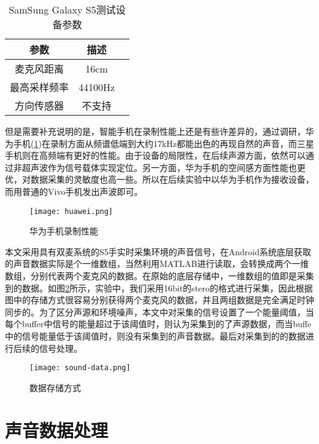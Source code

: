 \documentclass[winfonts]{njuthesis}
\begin{document}
		\begin{table}[H]
			\setlength{\belowcaptionskip}{7pt}
			\caption{SamSung Galaxy S5测试设备参数}
			\centering
			\begin{tabular}{ccc}
				\hline 
				参数 & 描述 \\
				\hline
				麦克风距离 & 16cm \\
				最高采样频率 & 44100Hz\\
				方向传感器 & 不支持\\
				\hline
			\end{tabular} 
			\vspace{0.2cm}
			\label{table: parameters-of-S5}
		\end{table}
	
		但是需要补充说明的是，智能手机在录制性能上还是有些许差异的，通过调研，华为手机(\ref{fig: huawei})在录制方面从频谱低端到大约17kHz都能出色的再现自然的声音，而三星手机则在高频端有更好的性能。由于设备的局限性，在后续声源方面，依然可以通过非超声波作为信号载体实现定位。另一方面，华为手机的空间感方面性能也更优，对数据采集的灵敏度也高一些。所以在后续实验中以华为手机作为接收设备，而用普通的Vivo手机发出声波即可。
		
		\begin{figure}[H]
			\centering
			\texttt{[image: huawei.png]} 
			\caption{华为手机录制性能}
			\label{fig: huawei}
		\end{figure}
	
		本文采用具有双麦系统的S5手实时采集环境的声音信号，在Android系统底层获取的声音数据实际是个一维数组，当然利用MATLAB进行读取，会转换成两个一维数组，分别代表两个麦克风的数据。在原始的底层存储中，一维数组的值即是采集到的数据。如图\ref{fig: sound-data}所示，实验中，我们采用16bit的stero的格式进行采集，因此根据图中的存储方式很容易分别获得两个麦克风的数据，并且两组数据是完全满足时钟同步的。为了区分声源和环境噪声，本文中对采集的信号设置了一个能量阈值，当每个buffer中信号的能量超过于该阈值时，则认为采集到的了声源数据，而当buffe中的信号能量低于该阈值时，则没有采集到的声音数据。最后对采集到的的数据进行后续的信号处理。
		
		\begin{figure}[H]
			\centering
			\texttt{[image: sound-data.png]} 
			\caption{数据存储方式}
			\label{fig: sound-data}
		\end{figure}
	
	\section{声音数据处理}
	
\end{document}
